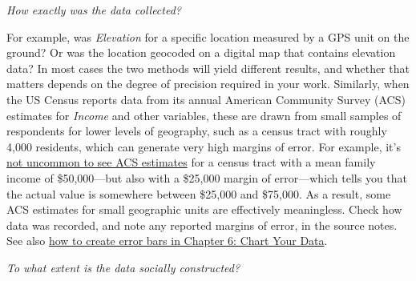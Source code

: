 \documentclass[
  english,
]{book}
\begin{document}
\emph{How exactly was the data collected?}

For example, was \emph{Elevation} for a specific location measured by a GPS unit on the ground? Or was the location geocoded on a digital map that contains elevation data? In most cases the two methods will yield different results, and whether that matters depends on the degree of precision required in your work. Similarly, when the US Census reports data from its annual American Community Survey (ACS) estimates for \emph{Income} and other variables, these are drawn from small samples of respondents for lower levels of geography, such as a census tract with roughly 4,000 residents, which can generate very high margins of error. For example, it's \href{data/ct-tract-income-moe-acs2018.xlsx}{not uncommon to see ACS estimates} for a census tract with a mean family income of \$50,000---but also with a \$25,000 margin of error---which tells you that the actual value is somewhere between \$25,000 and \$75,000. As a result, some ACS estimates for small geographic units are effectively meaningless. Check how data was recorded, and note any reported margins of error, in the source notes. See also \href{chart.html}{how to create error bars in Chapter 6: Chart Your Data}.

\emph{To what extent is the data socially constructed?}
\end{document}
